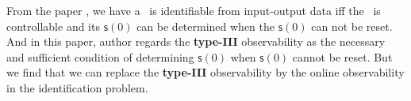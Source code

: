 From the paper \cite{Cheng2011Identification}, we have a \BCN\ is identifiable from input-output data iff the \BCN\ is controllable and its $\mathsf{s}(0)$ can be determined  when the $\mathsf{s}(0)$ can not be reset. And in this paper, author regards the {\bf type-III} observability as the necessary and sufficient condition of determining $\mathsf{s}(0)$ when $\mathsf{s}(0)$ cannot be reset. But we find that we can replace the {\bf type-III} observability by the online observability in the identification problem.



